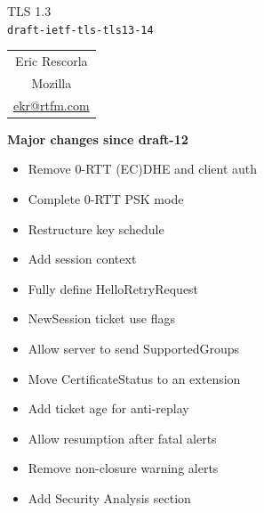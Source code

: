 \documentclass[helvetica]{seminar}
\newcommand{\heading}[1]{%
  \begin{center} 
    \large\bf 
    #1 
  \end{center} 
  \vspace{.4 in}}
\begin{document}
\begin{slide}
\begin{center}
\vspace{.5 in}
\LARGE{{\bf}TLS 1.3\\{\small \verb^draft-ietf-tls-tls13-14^}}\\
\vspace{.2in}
\large{
\begin{tabular}{c}
Eric Rescorla\\
Mozilla\\
\url{ekr@rtfm.com}
\end{tabular}
}
\end{center}
\end{slide}

\centerslidesfalse 

\begin{slide}
\heading{Major changes since draft-12}

\vspace{-5ex}
\begin{itemize}
\item Remove 0-RTT (EC)DHE and client auth
\item Complete 0-RTT PSK mode
\item Restructure key schedule
\item Add session context
\item Fully define HelloRetryRequest
\item NewSession ticket use flags
\item Allow server to send SupportedGroups
\item Move CertificateStatus to an extension
\item Add ticket age for anti-replay
\item Allow resumption after fatal alerts
\item Remove non-closure warning alerts
\item Add Security Analysis section
\end{itemize}

\end{slide}
\end{document}
